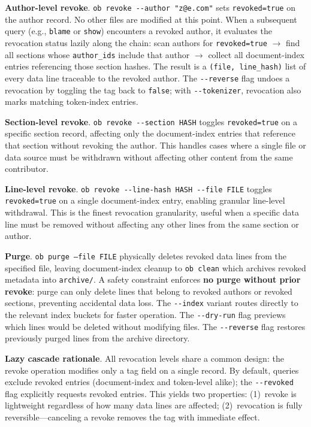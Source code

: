 \textbf{Author-level revoke}. \texttt{ob revoke -{}-author "z@e.com"} sets \texttt{revoked=true} on the author record. No other files are modified at this point. When a subsequent query (e.g., \texttt{blame} or \texttt{show}) encounters a revoked author, it evaluates the revocation status lazily along the chain: scan authors for \texttt{revoked=true} $\rightarrow$ find all sections whose \texttt{author\_ids} include that author $\rightarrow$ collect all document-index entries referencing those section hashes. The result is a \texttt{(file, line\_hash)} list of every data line traceable to the revoked author. The \texttt{-{}-reverse} flag undoes a revocation by toggling the tag back to \texttt{false}; with \texttt{-{}-tokenizer}, revocation also marks matching token-index entries.

\textbf{Section-level revoke}. \texttt{ob revoke -{}-section HASH} toggles \texttt{revoked=true} on a specific section record, affecting only the document-index entries that reference that section without revoking the author. This handles cases where a single file or data source must be withdrawn without affecting other content from the same contributor.

\textbf{Line-level revoke}. \texttt{ob revoke -{}-line-hash HASH -{}-file FILE} toggles \texttt{revoked=true} on a single document-index entry, enabling granular line-level withdrawal. This is the finest revocation granularity, useful when a specific data line must be removed without affecting any other lines from the same section or author.

\textbf{Purge}. \texttt{ob purge --file FILE} physically deletes revoked data lines from the specified file, leaving document-index cleanup to \texttt{ob clean} which archives revoked metadata into \texttt{archive/}. A safety constraint enforces \textbf{no purge without prior revoke}: purge can only delete lines that belong to revoked authors or revoked sections, preventing accidental data loss. The \texttt{-{}-index} variant routes directly to the relevant index buckets for faster operation. The \texttt{-{}-dry-run} flag previews which lines would be deleted without modifying files. The \texttt{-{}-reverse} flag restores previously purged lines from the archive directory.

\textbf{Lazy cascade rationale}. All revocation levels share a common design: the revoke operation modifies only a tag field on a single record. By default, queries exclude revoked entries (document-index and token-level alike); the \texttt{-{}-revoked} flag explicitly requests revoked entries. This yields two properties: (1)~revoke is lightweight regardless of how many data lines are affected; (2)~revocation is fully reversible---canceling a revoke removes the tag with immediate effect.

